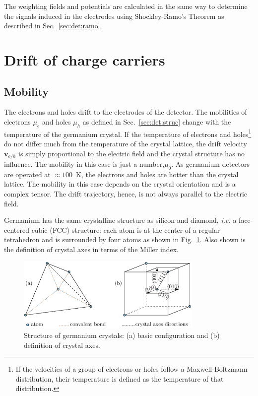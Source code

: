 The weighting fields and potentials are calculated in the same way to
determine the signals induced in the electrodes using Shockley-Ramo's
Theorem \cite{Gat82, Rad88, He00} as described in
Sec.~\ref{sec:det:ramo}.
 
 
\section{Drift of charge carriers} 
\label{sec:pss:drift} 
 
\subsection{Mobility} 
\label{sec:pss:mobi} 
The electrons and holes drift to the electrodes of the detector. The
mobilities of electrons $\mu_{e}$ and holes $\mu_{h}$ as defined in
Sec.~\ref{sec:det:struc} change with the temperature of the germanium
crystal. If the temperature of electrons and holes\footnote{If the
velocities of a group of electrons or holes follow a Maxwell-Boltzmann
distribution, their temperature is defined as the temperature of that
distribution.} do not differ much from the temperature of the crystal
lattice, the drift velocity $\mathbf{v}_{e/h}$ is simply proportional
to the electric field and the crystal structure has no
influence. The mobility in this case is just a number,$\mu_{0}$. As
germanium detectors are operated at $\approx 100$~K, the electrons and
holes are hotter than the crystal lattice. The mobility in this case
depends on the crystal orientation and is a complex tensor. The drift
trajectory, hence, is not always parallel to the electric field.
 
Germanium has the same crystalline structure as silicon and diamond,
\textit{i.e.} a face-centered cubic (FCC) structure: each atom is at
the center of a regular tetrahedron and is surrounded by four atoms as
shown in Fig.~\ref{fig:pss:xtal}. Also shown is the definition of
crystal axes in terms of the Miller index.
 
\begin{figure}[tbhp] 
\centering 
\includegraphics[width=0.8\textwidth]{xtalStruc}   
\caption{Structure of germanium crystals: (a) basic configuration and
(b) definition of crystal axes.}
\label{fig:pss:xtal} 
\end{figure} 
 
